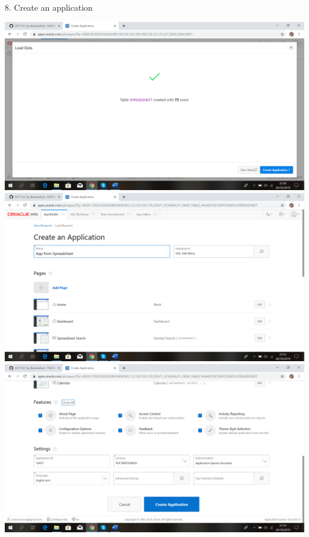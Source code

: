 \documentclass{article}
\begin{document}
\item 8. Create an application
\begin{center}
  \includegraphics[width=10cm\textwidth]{figure/10.png}
  \includegraphics[width=10cm\textwidth]{figure/11.png}
  \includegraphics[width=10cm\textwidth]{figure/12.png}
\end{center}
\end{document}
